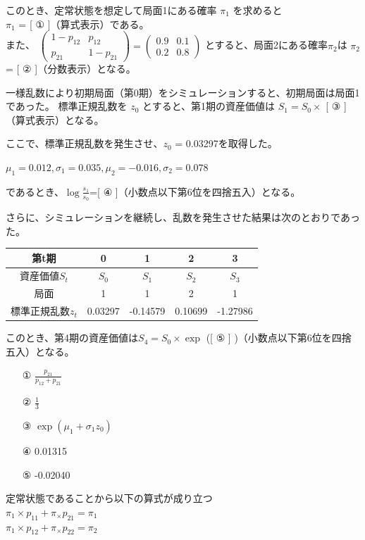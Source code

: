 \documentclass[report,gutter=10mm,fore-edge=10mm,uplatex,dvipdfmx]{jlreq}
\begin{document}
このとき、定常状態を想定して局面1にある確率 $\pi_{1}$ を求めると\\
$\pi_1$ = [ ① ]（算式表示）である。\\
また、
$\begin{pmatrix}
1 - p_{12} & p_{12} \\
p_{21} & 1 - p_{21}
\end{pmatrix}
=
\begin{pmatrix}
0.9 &0.1 \\
0.2 & 0.8
\end{pmatrix}$
とすると、局面2にある確率$\pi_2$は
$\pi_2$ = [ ② ]（分数表示）となる。

一様乱数により初期局面（第0期）をシミュレーションすると、初期局面は局面1であった。
標準正規乱数を $z_0$ とすると、第1期の資産価値は
$S_1=S_0\times$ [ ③ ]（算式表示）となる。

ここで、標準正規乱数を発生させ、$z_0$ = 0.03297を取得した。

$ \mu_1= 0.012, \sigma_1 = 0.035, \mu_2 = -0.016, \sigma_2 = 0.078$

であるとき、$\log{\frac{s_1}{s_0}}$=[ ④ ]（小数点以下第6位を四捨五入）となる。

さらに、シミュレーションを継続し、乱数を発生させた結果は次のとおりであった。

\begin{tabular}{|c|c|c|c|c|}
\hline 第t期&0&1&2&3\\ \hline
 資産価値$S_t$&$S_0$&$S_1$&$S_2$&$S_3$\\ \hline
 局面&1&1&2&1\\ \hline
 標準正規乱数$z_t$&0.03297&-0.14579&0.10699&-1.27986\\ \hline
\end{tabular}

このとき、第4期の資産価値は$S_4=S_0\times\exp$ ([ ⑤ ] )（小数点以下第6位を四捨五入）となる。

\answer{}
\begin{itemize}
 \item [①] $\frac{p_{21}}{p_{12}+p_{21}}$
 \item [②] $\frac{1}{3}$
 \item [③] $\exp{(\mu_1+\sigma_1z_0)}$
 \item [④] 0.01315
 \item [⑤] -0.02040
\end{itemize}

定常状態であることから以下の算式が成り立つ\\
$\pi_1\times p_{11}+ \pi_\times p_{21}=\pi_1$\\
$\pi_1\times p_{12}+ \pi_\times p_{22}=\pi_2$
\end{document}
